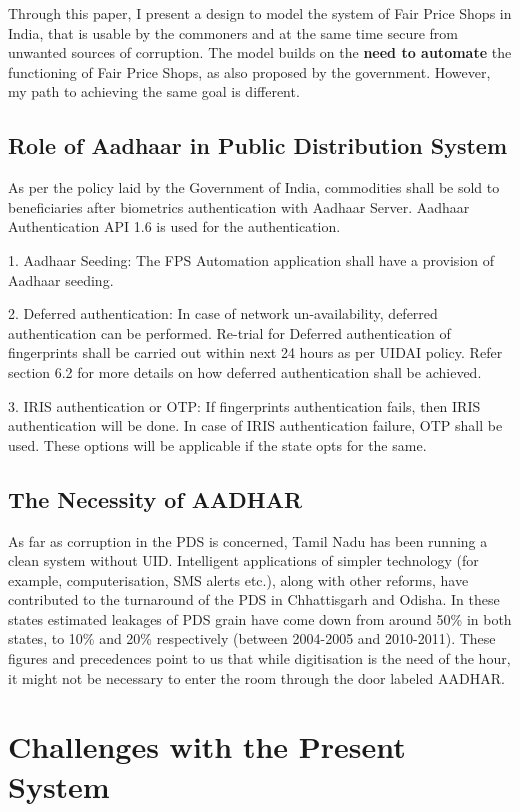 \documentclass[a4paper,12pt]{extarticle}
\begin{document}
Through this paper, I present a design to model the system of Fair Price Shops in India, that is usable by the commoners and at the same time secure from unwanted sources of corruption. The model builds on the\textbf{ need to automate} the functioning of Fair Price Shops, as also proposed by the government. However, my path to achieving the same goal is different.


\subsection{Role of Aadhaar in Public Distribution System}
As per the policy laid by the Government of India, commodities shall be sold to beneficiaries after biometrics authentication with Aadhaar Server. Aadhaar Authentication API 1.6 is used for the authentication. 

1.	Aadhaar Seeding: The FPS Automation application shall have a provision of Aadhaar seeding. 

2.	Deferred authentication: In case of network un-availability, deferred authentication can be performed. Re-trial for Deferred authentication of fingerprints shall be carried out within next 24 hours as per UIDAI policy. Refer section 6.2 for more details on how deferred authentication shall be achieved. 

3.	IRIS authentication or OTP: If fingerprints authentication fails, then IRIS authentication will be done. In case of IRIS authentication failure, OTP shall be used. These options will be applicable if the state opts for the same.

\subsection{The Necessity of AADHAR}
As far as corruption in the PDS is concerned, Tamil Nadu has been running a clean system without UID. Intelligent applications of simpler technology (for example, computerisation, SMS alerts etc.), along with other
reforms, have contributed to the turnaround of the PDS in Chhattisgarh and Odisha. In these states estimated leakages of PDS grain have come down from around 50\% in both states, to 10\% and 20\% respectively (between 2004-2005 and 2010-2011).
These figures and precedences point to us that while digitisation is the need of the hour, it might not be necessary to enter the room through the door labeled AADHAR.

\section{Challenges with the Present System}
\end{document}
